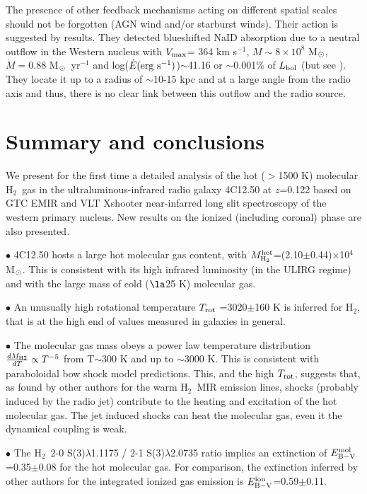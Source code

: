 \documentclass{aa}
\newcommand{\kmsb}{km s$^{-1}$}
\newcommand{\hmol}{H$_2$~}
\newcommand{\msun}{M$_{\rm \odot}$~}
\newcommand{\msunb}{M$_{\rm \odot}$}
\begin{document}
The presence of other feedback mechanisms acting on different spatial scales  should not be forgotten  (AGN wind and/or starburst winds).  Their action is suggested by 
\cite{Rupke2005a} results. They detected blueshifted NaID absorption due to a neutral outflow  in the Western nucleus with $V_ {\rm max}$= 364 \kmsb, $M\sim 8\times10^8$ \msunb, $\dot M =0.88$ \msun yr$^{-1}$ and log($\dot E \rm (erg~s^{-1})$)$\sim$41.16 or $\sim$0.001\% of $L_{\rm bol}$ (but see \citealt{Perna2021}). They locate it up to a radius of $\sim$10-15 kpc and at a large angle from  the radio axis and thus, there is no clear link between this outflow and the radio source.


\section{Summary and conclusions}


We present for the first time a detailed analysis of  the hot ($>$1500 K) molecular \hmol gas  in the ultraluminous-infrared radio galaxy  4C12.50 at $z$=0.122 based on GTC EMIR  and VLT  Xshooter near-infarred long slit spectroscopy of the western primary nucleus. New results on the ionized (including coronal) phase are also presented.


 $\bullet$ 4C12.50 hosts a large  hot molecular gas content, with $M_{\rm H_2}^{\rm hot}$=(2.10$\pm$0.44)$\times$10$^{4}$ M$_{\rm \odot}$. This is consistent with its high infrared luminosity (in the ULIRG regime) and with the large mass of cold ($\la$25 K) molecular gas. 



$\bullet$ An unusually high rotational temperature $T_{\rm rot}$ =3020$\pm$160 K is inferred for H$_2$, that is at the high end of values measured in galaxies in general.  



$\bullet$ The molecular gas mass obeys  a power law temperature distribution   $\frac{d M_{\rm H2}}{dT}\propto T^{-5}$   from T$\sim$300 K and up to  $\sim$3000 K.  This is consistent with paraboloidal bow shock model predictions. This, and the high $T_{\rm rot}$, suggests that, as found by other authors for the warm \hmol MIR emission lines, shocks (probably induced by the radio jet) contribute to the heating and excitation of the hot molecular gas. The jet induced shocks can heat the molecular gas, even it the dynamical coupling is weak.


$\bullet$ The \hmol 2-0 S(3)$\lambda$1.1175 / 2-1 S(3)$\lambda$2.0735 ratio implies an extinction of 
$E_{\rm B-V}^{\rm mol}$=0.35$\pm$0.08 for the hot molecular gas.  For comparison,  the extinction inferred by other authors for the integrated ionized gas emission is $E_{\rm B-V}^{\rm ion}$=0.59$\pm$0.11.
\end{document}
